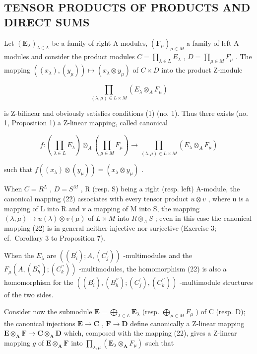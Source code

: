 \subsection{TENSOR PRODUCTS OF PRODUCTS AND DIRECT SUMS}

Let \((\mathbf{E}_{\lambda})_{\lambda \in L}\) be a family of right A-modules, \((\mathbf{F}_{\mu})_{\mu \in M}\) a family of left A-modules and consider the product modules \(C = \prod_{\lambda \in L} E_{\lambda}\) , \(D = \prod_{\mu \in M} F_{\mu}\) . The mapping \(((x_{\lambda}), (y_{\mu})) \mapsto (x_{\lambda} \otimes y_{\mu})\) of \(C \times D\) into the product Z-module

\[
\prod_ {(\lambda , \mu) \in L \times M} (E _ {\lambda} \otimes_ {A} F _ {\mu})
\]

is Z-bilinear and obviously satisfies conditions (1) (no. 1). Thus there exists (no. 1, Proposition 1) a Z-linear mapping, called canonical

\[
f: \left(\prod_ {\lambda \in L} E _ {\lambda}\right) \otimes_ {A} \left(\prod_ {\mu \in M} F _ {\mu}\right)\rightarrow \prod_ {(\lambda , \mu) \in L \times M} (E _ {\lambda} \otimes_ {A} F _ {\mu})\tag{22}
\]

such that \(f((x_{\lambda}) \otimes (y_{\mu})) = (x_{\lambda} \otimes y_{\mu})\) .

When \(C = R^{L}\) , \(D = S^{M}\) , R (resp. S) being a right (resp. left) A-module, the canonical mapping (22) associates with every tensor product \(u \otimes v\) , where u is a mapping of L into R and v a mapping of M into S, the mapping \((\lambda, \mu) \mapsto u(\lambda) \otimes v(\mu)\) of \(L \times M\) into \(R \otimes_{A} S\) ; even in this case the canonical mapping (22) is in general neither injective nor surjective (Exercise 3; cf.~Corollary 3 to Proposition 7).

When the \(E_{\lambda}\) are \(((B_{i}^{\prime}); A, (C_{j}^{\prime}))\) -multimodules and the \(F_{\mu}(A, (B_{h}^{\prime\prime}); (C_{k}^{\prime\prime}))\) -multimodules, the homomorphism (22) is also a homomorphism for the \(((B_{i}^{\prime}), (B_{h}^{\prime\prime}); (C_{j}^{\prime}), (C_{k}^{\prime\prime}))\) -multimodule structures of the two sides.

Consider now the submodule \(\mathbf{E} = \bigoplus_{\lambda \in L} \mathbf{E}_{\lambda}\) (resp. \(\bigoplus_{\mu \in M} F_{\mu}\) ) of C (resp. D); the canonical injections \(\mathbf{E} \to \mathbf{C}\) , \(\mathbf{F} \to \mathbf{D}\) define canonically a Z-linear mapping \(\mathbf{E} \otimes_{\mathbf{A}} \mathbf{F} \to \mathbf{C} \otimes_{\mathbf{A}} \mathbf{D}\) which, composed with the mapping (22), gives a Z-linear mapping \(g\) of \(\mathbf{E} \otimes_{\mathbf{A}} \mathbf{F}\) into \(\prod_{\lambda, \mu} (\mathbf{E}_{\lambda} \otimes_{\mathbf{A}} F_{\mu})\) such that


